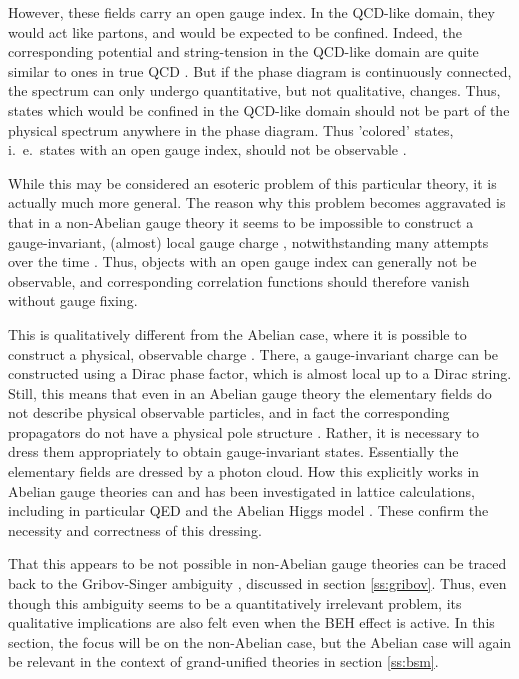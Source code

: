 \documentclass[final,12pt,3p,longtitle]{elsarticle}
\newcommand*{\1}{1\!\!\!\bot}
\begin{document}
However, these fields carry an open gauge index. In the QCD-like domain, they would act like partons, and would be expected to be confined. Indeed, the corresponding potential and string-tension in the QCD-like domain are quite similar to ones in true QCD \cite{Knechtli:1999qe,Knechtli:1998gf}. But if the phase diagram is continuously connected, the spectrum can only undergo quantitative, but not qualitative, changes. Thus, states which would be confined in the QCD-like domain should not be part of the physical spectrum anywhere in the phase diagram. Thus 'colored' states, i.\ e.\ states with an open gauge index, should not be observable \cite{'tHooft:1979bj,Banks:1979fi,Frohlich:1980gj}.

While this may be considered an esoteric problem of this particular theory, it is actually much more general. The reason why this problem becomes aggravated is that in a non-Abelian gauge theory it seems to be impossible to construct a gauge-invariant, (almost) local gauge charge \cite{Haag:1992hx,Ilderton:2007qy,Heinzl:2008bu,Strocchi:2013awa}, notwithstanding many attempts over the time \cite{Lavelle:1995ty,Polyakov:1978vu,Susskind:1979up,Gross:1980br,Marchesini:1981kt,Bagan:1999jf,Bagan:1999jk,Ilderton:2007qy,Lavelle:2011yc,Heinzl:2008bu}. Thus, objects with an open gauge index can generally not be observable, and corresponding correlation functions should therefore vanish without gauge fixing.

This is qualitatively different from the Abelian case, where it is possible to construct a physical, observable charge \cite{Frere:1974ia,Haag:1992hx,Heinzl:2008bu}. There, a gauge-invariant charge can be constructed using a Dirac phase factor, which is almost local up to a Dirac string. Still, this means that even in an Abelian gauge theory the elementary fields do not describe physical observable particles, and in fact the corresponding propagators do not have a physical pole structure \cite{Maris:1996zg,Alkofer:2000wg}. Rather, it is necessary to dress them appropriately to obtain gauge-invariant states. Essentially the elementary fields are dressed by a photon cloud. How this explicitly works in Abelian gauge theories can and has been investigated in lattice calculations, including in particular QED and the Abelian Higgs model \cite{Woloshyn:2017rhe,Evertz:1986ur,Fradkin:1978dv,Frere:1974ia,Lucini:2015hfa}. These confirm the necessity and correctness of this dressing.

That this appears to be not possible \cite{Haag:1992hx} in non-Abelian gauge theories can be traced back to the Gribov-Singer ambiguity \cite{Ilderton:2007qy,Lavelle:2011yc,Heinzl:2008bu}, discussed in section \ref{ss:gribov}. Thus, even though this ambiguity seems to be a quantitatively irrelevant problem, its qualitative implications are also felt even when the BEH effect is active. In this section, the focus will be on the non-Abelian case, but the Abelian case will again be relevant in the context of grand-unified theories in section \ref{ss:bsm}.
\end{document}
